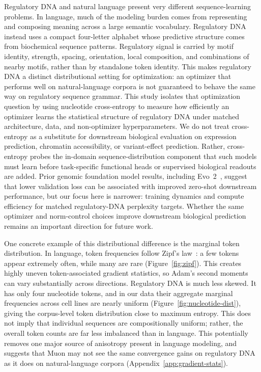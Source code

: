 \documentclass{article}
\begin{document}
Regulatory DNA and natural language present very different sequence-learning problems. In language, much of the modeling burden comes from representing and composing meaning across a large semantic vocabulary. Regulatory DNA instead uses a compact four-letter alphabet whose predictive structure comes from biochemical sequence patterns. Regulatory signal is carried by motif identity, strength, spacing, orientation, local composition, and combinations of nearby motifs, rather than by standalone token identity. This makes regulatory DNA a distinct distributional setting for optimization: an optimizer that performs well on natural-language corpora is not guaranteed to behave the same way on regulatory sequence grammar. This study isolates that optimization question by using nucleotide cross-entropy to measure how efficiently an optimizer learns the statistical structure of regulatory DNA under matched architecture, data, and non-optimizer hyperparameters. We do not treat cross-entropy as a substitute for downstream biological evaluation on expression prediction, chromatin accessibility, or variant-effect prediction. Rather, cross-entropy probes the in-domain sequence-distribution component that such models must learn before task-specific functional heads or supervised biological readouts are added. Prior genomic foundation model results, including Evo~2~\citep{evo2}, suggest that lower validation loss can be associated with improved zero-shot downstream performance, but our focus here is narrower: training dynamics and compute efficiency for matched regulatory-DNA perplexity targets. Whether the same optimizer and norm-control choices improve downstream biological prediction remains an important direction for future work.

One concrete example of this distributional difference is the marginal token distribution. In language, token frequencies follow Zipf's law~\citep{zipf-review}: a few tokens appear extremely often, while many are rare (Figure~\ref{fig:zipf}). This creates highly uneven token-associated gradient statistics, so Adam's second moments can vary substantially across directions. Regulatory DNA is much less skewed. It has only four nucleotide tokens, and in our data their aggregate marginal frequencies across cell lines are nearly uniform (Figure~\ref{fig:nucleotide-dist}), giving the corpus-level token distribution close to maximum entropy. This does not imply that individual sequences are compositionally uniform; rather, the overall token counts are far less imbalanced than in language. This potentially removes one major source of anisotropy present in language modeling, and suggests that Muon may not see the same convergence gains on regulatory DNA as it does on natural-language corpora (Appendix~\ref{app:gradient-stats}).
\end{document}
